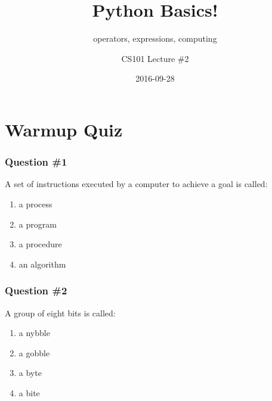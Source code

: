 \documentclass[11pt]{beamer}
\title{Python Basics!}
\subtitle{operators, expressions, computing}
\author{CS101 Lecture \#2}
\date{2016-09-28}
\begin{document}
  \setcounter{showProgressBar}{0}
  \setcounter{showSlideNumbers}{0}

\frame{\titlepage}

\setcounter{framenumber}{0}
\setcounter{showProgressBar}{1}
\setcounter{showSlideNumbers}{1}

\iffalse
\section{Administrivia}

\begin{frame}
  \frametitle{Administrivia}
  \Enlarge
  \begin{itemize}
  \item Complete homework before THIS Friday at 6:00 p.m.
  \end{itemize}
\end{frame}
\fi

\section{Warmup Quiz}

\begin{frame}
  \frametitle{Question \#1}
  \Enlarge

  A set of instructions executed by a computer to achieve a goal is called:
  \begin{enumerate}[label=\Alph*]
  \item  a process
  \item  a program
  \item  a procedure
  \item  an algorithm
  \end{enumerate}
\end{frame}

\begin{frame}
  \frametitle{Question \#2}
  \Enlarge

  A group of eight bits is called:
  \begin{enumerate}[label=\Alph*]
  \item  a nybble
  \item  a gobble
  \item  a byte
  \item  a bite
  \end{enumerate}
\end{frame}
\end{document}
